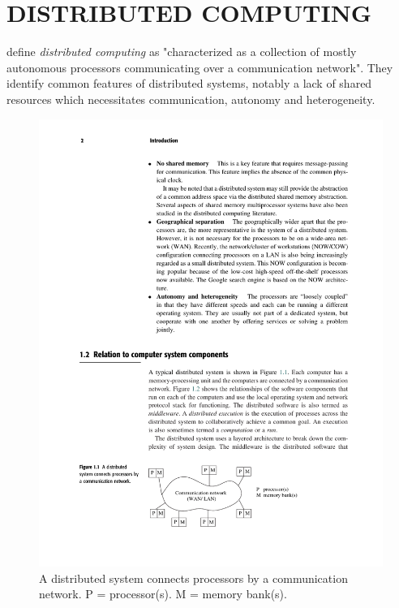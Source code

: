 \documentclass[../report.tex]{subfiles}
\begin{document}
\section{DISTRIBUTED COMPUTING}

\cite{kshemkalyani2011distributed} define \textit{distributed computing} as "characterized as a collection of mostly autonomous processors communicating over a communication network". They identify common features of distributed systems, notably a lack of shared resources which necessitates communication, autonomy and heterogeneity. \\

\begin{figure}[h!]
\centering
\includegraphics[width=0.8\linewidth]{figures/networkcomms.pdf}
\caption{A distributed system connects processors by a communication network. P = processor(s). M = memory bank(s). \cite[2]{kshemkalyani2011distributed}}
\label{fig:networkcomms}
\end{figure}
\end{document}
